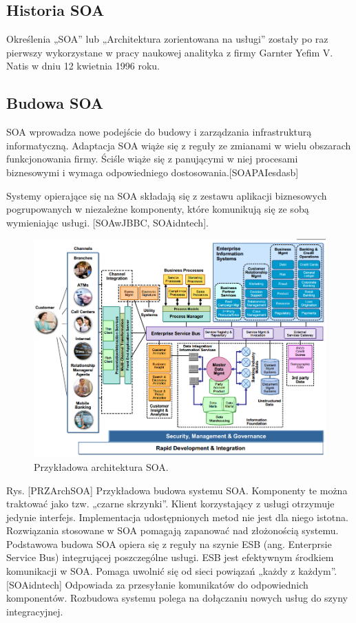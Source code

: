 \subsection{Historia SOA}
Określenia „SOA” lub „Architektura zorientowana na usługi” zostały po raz pierwszy wykorzystane w pracy naukowej analityka z firmy Garnter Yefim V. Natis w dniu 12 kwietnia 1996 roku. 

\subsection{Budowa SOA}
SOA wprowadza nowe podejście do budowy i zarządzania infrastrukturą informatyczną. Adaptacja SOA wiąże się z reguły ze zmianami w wielu obszarach funkcjonowania firmy. Ściśle wiąże się z panującymi w niej procesami biznesowymi i wymaga odpowiedniego dostosowania.[SOAPAIesdasb] 

Systemy opierające się na SOA składają się z zestawu aplikacji biznesowych pogrupowanych w niezależne komponenty, które komunikują się ze sobą wymieniając usługi. [SOAwJBBC, SOAidntech]. 

\begin{figure}[h!tbp]
\begin{centering}
\includegraphics[width=14cm]{img/soa_arch.png}
\caption[Przykładowa architektura SOA.]{Przykładowa architektura SOA. \cite{AnRTeqq}}\label{soa_arch}
\end{centering}
\end{figure}
Rys. [PRZArchSOA] Przykładowa budowa systemu SOA.
Komponenty te można traktować jako tzw. „czarne skrzynki”. Klient korzystający z usługi otrzymuje jedynie interfejs. Implementacja udostępnionych metod nie jest dla niego istotna.
Rozwiązania stosowane w SOA pomagają zapanować nad złożonością systemu. Podstawowa budowa SOA opiera się z reguły na szynie ESB (ang. Enterprsie Service Bus) integrującej poszczególne usługi. ESB jest efektywnym środkiem komunikacji w SOA. Pomaga uwolnić się od sieci powiązań „każdy z każdym”. [SOAidntech] Odpowiada za przesyłanie komunikatów do odpowiednich komponentów. Rozbudowa systemu polega na dołączaniu nowych usług do szyny integracyjnej. 
	
